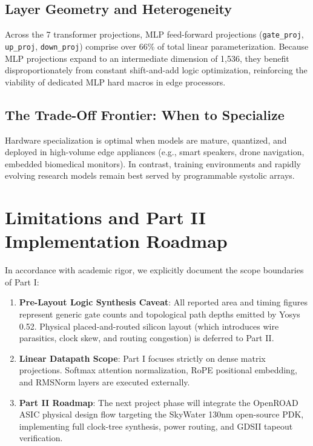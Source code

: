 \documentclass[11pt,a4paper]{article}
\begin{document}
\subsection{Layer Geometry and Heterogeneity}
Across the 7 transformer projections, MLP feed-forward projections (\texttt{gate\_proj}, \texttt{up\_proj}, \texttt{down\_proj}) comprise over 66\% of total linear parameterization. Because MLP projections expand to an intermediate dimension of 1,536, they benefit disproportionately from constant shift-and-add logic optimization, reinforcing the viability of dedicated MLP hard macros in edge processors.

\subsection{The Trade-Off Frontier: When to Specialize}
Hardware specialization is optimal when models are mature, quantized, and deployed in high-volume edge appliances (e.g., smart speakers, drone navigation, embedded biomedical monitors). In contrast, training environments and rapidly evolving research models remain best served by programmable systolic arrays.

\section{Limitations and Part II Implementation Roadmap}

In accordance with academic rigor, we explicitly document the scope boundaries of Part I:
\begin{enumerate}
    \item \textbf{Pre-Layout Logic Synthesis Caveat}: All reported area and timing figures represent generic gate counts and topological path depths emitted by Yosys 0.52. Physical placed-and-routed silicon layout (which introduces wire parasitics, clock skew, and routing congestion) is deferred to Part II.
    \item \textbf{Linear Datapath Scope}: Part I focuses strictly on dense matrix projections. Softmax attention normalization, RoPE positional embedding, and RMSNorm layers are executed externally.
    \item \textbf{Part II Roadmap}: The next project phase will integrate the OpenROAD ASIC physical design flow targeting the SkyWater 130nm open-source PDK, implementing full clock-tree synthesis, power routing, and GDSII tapeout verification.
\end{enumerate}
\end{document}
